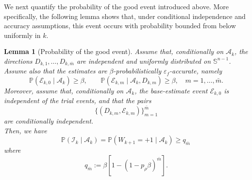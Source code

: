 \documentclass[11pt,a4paper]{article}
\newtheorem{lemma}{Lemma}[section]
\newcommand{\goldelta}{r}
\begin{document}
We next quantify the probability of the good event introduced above. More specifically, the following lemma shows that,
under conditional independence and accuracy assumptions, this event occurs
with probability bounded from below uniformly in \(k\).



\begin{lemma}[Probability of the good event]
\label{lem:good-event-probability}
Assume that, conditionally on \(\mathcal A_k\), the directions
\(D_{k,1},\ldots,D_{k,\bar{m}}\) are independent and uniformly distributed on
\(\mathbb S^{n-1}\). Assume also that the estimates are
\(\beta\)-probabilistically \(\varepsilon_f\)-accurate, namely
\[
    \mathbb P(\mathcal E_{k,0}\mid\mathcal A_k)\ge\beta,
    \qquad
    \mathbb P(\mathcal E_{k,m}\mid\mathcal A_k,D_{k,m})\ge\beta,
    \quad m=1,\ldots,\bar{m}.
\]
Moreover, assume that, conditionally on \(\mathcal A_k\), the base-estimate
event \(\mathcal E_{k,0}\) is independent of the trial events, and that the
pairs
\[
    \{(D_{k,m},\mathcal E_{k,m})\}_{m=1}^{\bar{m}}
\]
are conditionally independent.\\
Then,
we have
\[
    \mathbb P(\mathcal I_k\mid\mathcal A_k)
    =
    \mathbb P(W_{k+1}=+1\mid\mathcal A_k)
    \ge
    q_{\bar{m}}\,
\]
where
\[
    q_{\bar{m}}
    :=
    \beta\left[1-(1-p_\rho\beta)^{\bar{m}}\right].
\]
\end{lemma}
\end{document}
